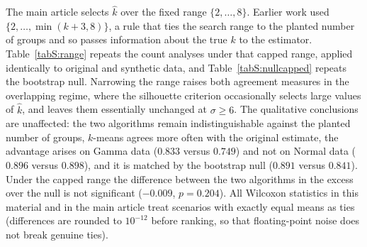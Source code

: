 \documentclass[pdflatex,referee]{sn-jnl}
\begin{document}
The main article selects $\hat{k}$ over the fixed range $\{2,\dots,8\}$. Earlier
work used $\{2,\dots,\min(k+3,8)\}$, a rule that ties the search range to the
planted number of groups and so passes information about the true $k$ to the
estimator. Table~\ref{tabS:range} repeats the count analyses under that capped
range, applied identically to original and synthetic data, and
Table~\ref{tabS:nullcapped} repeats the bootstrap null. Narrowing the range
raises both agreement measures in the overlapping regime, where the silhouette
criterion occasionally selects large values of $\hat{k}$, and leaves them
essentially unchanged at $\sigma \ge 6$. The qualitative conclusions are
unaffected: the two algorithms remain indistinguishable against the planted
number of groups, $k$-means agrees more often with the original estimate, the
advantage arises on Gamma data ($0.833$ versus $0.749$) and not on Normal data
($0.896$ versus $0.898$), and it is matched by the bootstrap null ($0.891$
versus $0.841$). Under the capped range the difference between the two
algorithms in the excess over the null is not significant ($-0.009$,
$p = 0.204$). All Wilcoxon statistics in this material and in the main
article treat scenarios with exactly equal means as ties (differences are
rounded to $10^{-12}$ before ranking, so that floating-point noise does not
break genuine ties).

\begin{table}[!htbp]
\centering
\caption{Recovery of the planted number of groups (RR) and agreement with the
  number estimated from the original data (AG), by separation and
  distribution family, under the fixed candidate range of the main article and
  under the capped range. Wilcoxon $W$ and $p$: paired signed-rank test of
  $k$-means against Ward across the 144 scenario-level means. Last row: overall
  bootstrap null $\mathrm{AG}_0$ ($B = 30$) under each range.}
\label{tabS:range}
\small

\end{table}

\begin{table}[!htbp]
\centering
\caption{Bootstrap null under the capped candidate range
  $\{2,\dots,\min(k+3,8)\}$: agreement after CART synthesis (AG), after
  bootstrap resampling ($\mathrm{AG}_0$, $B = 30$) and the excess
  $\mathrm{AG} - \mathrm{AG}_0$ (computed before rounding). Compare with
  Table~3 of the main article.}
\label{tabS:nullcapped}
\small

\end{table}
\end{document}
